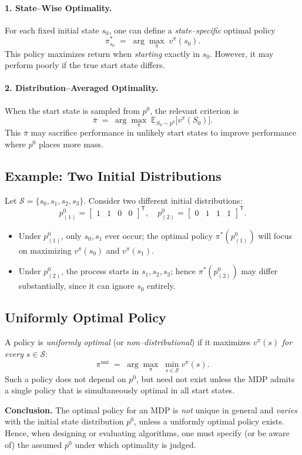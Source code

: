 \paragraph{1. State–Wise Optimality.}
For each fixed initial state $s_0$, one can define a \emph{state–specific} optimal policy
\[
\pi^*_{s_0}
\;=\;
\arg\max_{\pi}\;v^\pi(s_0).
\]
This policy maximizes return when \emph{starting} exactly in $s_0$. However, it may perform poorly if the true start state differs.

\paragraph{2. Distribution–Averaged Optimality.}
When the start state is sampled from $p^0$, the relevant criterion is
\[
\bar\pi
\;=\;
\arg\max_{\pi}\;\mathbb{E}_{S_0\sim p^0}\!\bigl[v^\pi(S_0)\bigr].
\]
This $\bar\pi$ may sacrifice performance in unlikely start states to improve performance where $p^0$ places more mass.

\subsection{Example: Two Initial Distributions}
Let $\mathcal{S}=\{s_0,s_1,s_2,s_3\}$. Consider two different initial distributions:
\[
p^0_{(1)}
=\begin{bmatrix}1 & 1 & 0 & 0\end{bmatrix}^\mathsf{T}, 
\quad
p^0_{(2)}
=\begin{bmatrix}0 & 1 & 1 & 1\end{bmatrix}^\mathsf{T}.
\]
\begin{itemize}
  \item Under $p^0_{(1)}$, only $s_0,s_1$ ever occur; the optimal policy $\pi^*(p^0_{(1)})$ will focus on maximizing $v^\pi(s_0)$ and $v^\pi(s_1)$.
  \item Under $p^0_{(2)}$, the process starts in $s_1,s_2,s_3$; hence $\pi^*(p^0_{(2)})$ may differ substantially, since it can ignore $s_0$ entirely.
\end{itemize}

\subsection{Uniformly Optimal Policy}
A policy is \emph{uniformly optimal} (or \emph{non–distributional}) if it maximizes $v^\pi(s)$ \emph{for every} $s\in\mathcal{S}$:
\[
\pi^{\mathrm{uni}}
\;=\;
\arg\max_{\pi}\;\min_{s\in\mathcal{S}} v^\pi(s).
\]
Such a policy does not depend on $p^0$, but need not exist unless the MDP admits a single policy that is simultaneously optimal in all start states.

\bigskip
\textbf{Conclusion.}  
The optimal policy for an MDP is \emph{not} unique in general and \emph{varies} with the initial state distribution $p^0$, unless a uniformly optimal policy exists. Hence, when designing or evaluating algorithms, one must specify (or be aware of) the assumed $p^0$ under which optimality is judged.





